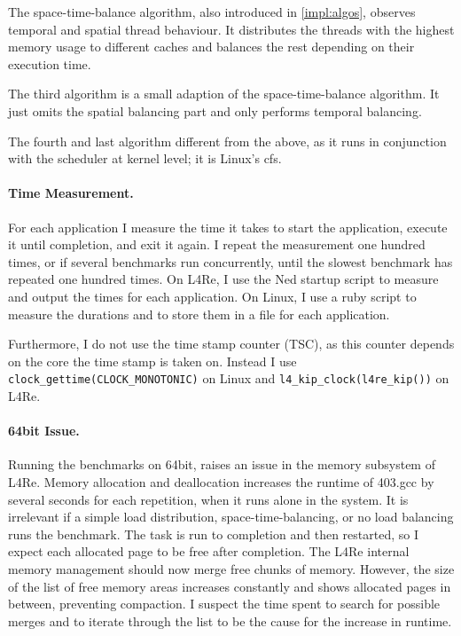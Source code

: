 The space-time-balance algorithm, also introduced in \ref{impl:algos},
observes temporal and spatial thread behaviour.
It distributes the threads with the highest memory usage to different caches
and balances the rest depending on their execution time.

The third algorithm is a small adaption of the space-time-balance algorithm.
It just omits the spatial balancing part and only performs temporal balancing.

The fourth and last algorithm different from the above, as it runs in
conjunction with the scheduler at kernel level; it is Linux's \gls{cfs}.


\paragraph{Time Measurement.}
For each application I measure the time it takes to start the application,
execute it until completion, and exit it again.
I repeat the measurement one hundred times, or if several benchmarks run
concurrently, until the slowest benchmark has repeated one hundred times.
On L4Re, I use the Ned startup script to measure and output the times for
each application.
On Linux, I use a ruby script to measure the durations and to store them in a
file for each application.

Furthermore, I do not use the time stamp counter (TSC), as this counter depends
on the core the time stamp is taken on.
Instead I use \texttt{clock\_gettime(CLOCK\_MONOTONIC)} on Linux and
\texttt{l4\_kip\_clock(l4re\_kip())} on L4Re.
 

\paragraph{64bit Issue.}
Running the benchmarks on 64bit, raises an issue in the memory subsystem of L4Re.
Memory allocation and deallocation increases the runtime of 403.gcc by several
seconds for each repetition, when it runs alone in the system.
It is irrelevant if a simple load distribution, space-time-balancing,
or no load balancing runs the benchmark.
The task is run to completion and then restarted, so I expect each allocated
page to be free after completion.
The L4Re internal memory management should now merge free chunks of memory.
However, the size of the list of free memory areas increases constantly and
shows allocated pages in between, preventing compaction.
I suspect the time spent to search for possible merges and to iterate through
the list to be the cause for the increase in runtime.

